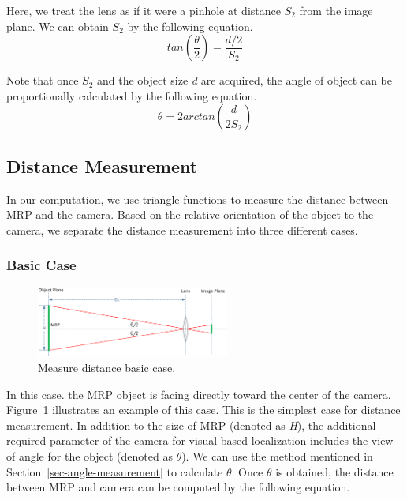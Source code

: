 Here, we treat the lens as if it were a pinhole at distance $S_2$ from the image plane. We can obtain $S_2$ by the following equation.
\[tan(\frac{\theta}{2})=\frac{d/2}{S_2}\]

Note that once $S_2$ and the object size \emph{d} are acquired, the angle of object can be proportionally calculated by the following equation.
\[\theta=2arctan(\frac{d}{2S_2})\]

\subsection{Distance Measurement}

In our computation, we use triangle functions to measure the distance between MRP and the camera.
Based on the relative orientation of the object to the camera, we separate the distance measurement into three different cases.

\subsubsection{Basic Case}\label{sec-measure-distance-basic-case}

\begin{figure}
  \vspace{-20pt}
  \begin{center}
    \includegraphics[width=2.5in]{fig/fig-distance-case1.eps}
  \end{center}
  \vspace{-20pt}
  \caption{Measure distance basic case.}\label{fig-distance-case1}
  \vspace{-20pt}
\end{figure}
In this case. the MRP object is facing directly toward the center of the camera. Figure~\ref{fig-distance-case1} illustrates an example of this case. This is the simplest case for distance measurement. In addition to the size of MRP (denoted as \emph{H}), the additional required parameter of the camera for visual-based localization includes the view of angle for the object (denoted as $\theta$). We can use the method mentioned in Section~\ref{sec-angle-measurement} to calculate $\theta$. Once $\theta$ is obtained, the distance between MRP and camera can be computed by the following equation.

